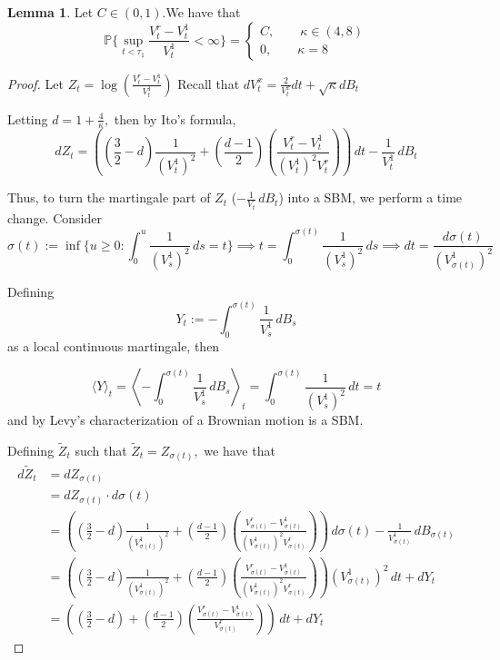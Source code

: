 \documentclass[10pt, oneside]{article}
\newcommand{\bbP}{\mathbb{P}}
\theoremstyle{definition}
\newtheorem{lem}{Lemma}
\newcommand{\bbP}{\mathbb{P}}
\begin{document}
\begin{lem}
Let $C\in (0,1). $We have that \[\bbP\{\sup_{t < \tau_1} \frac{V_t^r - V_t^1}{V_t^1} < \infty\} = \begin{cases}
        C, \qquad \kappa\in (4,8)\\
        0, \qquad \kappa  = 8
    \end{cases}\]
\end{lem}
\begin{proof}
    Let $Z_t = \log \left(\frac{V_t^r - V_t^1}{V_t^1}\right)$ Recall that $dV_t^x = \frac{2}{V_t^x}dt + \sqrt{\kappa}dB_t$
    
    Letting $d = 1 + \frac{4}{\kappa},$ then by Ito's formula, 
    \[dZ_t = \left((\frac{3}{2} -d) \frac{1}{(V_t^1)^2} + \left(\frac{d-1}{2}\right)\left(\frac{V_t^r - V_t^1}{(V_t^1)^2 V_t^r}\right)\right)\,dt - \frac{1}{V_t^1} \,dB_t\]

Thus, to turn the martingale part of $Z_t$ ($-\frac{1}{V_t}\,dB_t$) into a SBM, we perform a time change. Consider
\[\sigma(t) := \inf\{u \geq 0 : \int_0^u \frac{1}{(V_s^1)^2}\,ds = t\} \implies t = \int_0^{\sigma(t)}\frac{1}{(V_s^1)^2}\,ds  \implies dt = \frac{d\sigma(t)}{(V_{\sigma(t)}^1)^2}\]

Defining 
\[Y_t:= -\int_0^{\sigma(t)}\frac{1}{V_s^1}\,dB_s\] as a local continuous martingale, then 

\[\langle Y\rangle_t = \left\langle- \int_0^{\sigma(t)} \frac{1}{V_s^1}\,dB_s\right\rangle_t = \int_0^{\sigma(t)}\frac{1}{(V_s^1)^2}\,dt = t\] and by Levy's characterization of a Brownian motion is a SBM. 

Defining $\tilde{Z}_t$ such that $\tilde{Z}_t = Z_{\sigma(t)},$ we have that
\begin{align*}
    d\tilde{Z}_t &= dZ_{\sigma(t)}\\
    &= dZ_{\sigma(t)}\cdot d\sigma(t)\\
    &= \left((\frac{3}{2} -d) \frac{1}{(V_{\sigma(t)}^1)^2} + \left(\frac{d-1}{2}\right)\left(\frac{V_{\sigma(t)}^r - V_{\sigma(t)}^1}{(V_{\sigma(t)}^1)^2 V_{\sigma(t)}^r}\right)\right)\,d\sigma(t) - \frac{1}{V_{\sigma(t)}^1} \,dB_{\sigma(t)}\\
    &= \left((\frac{3}{2} -d) \frac{1}{(V_{\sigma(t)}^1)^2} + \left(\frac{d-1}{2}\right)\left(\frac{V_{\sigma(t)}^r - V_{\sigma(t)}^1}{(V_{\sigma(t)}^1)^2 V_{\sigma(t)}^r}\right)\right)(V_{\sigma(t)}^1)^2\,dt + dY_t\\
    &= \left((\frac{3}{2} -d) + \left(\frac{d-1}{2}\right)\left(\frac{V_{\sigma(t)}^r - V_{\sigma(t)}^1}{ V_{\sigma(t)}^r}\right)\right)\,dt + dY_t
\end{align*}

\end{proof}

    
\end{document}
